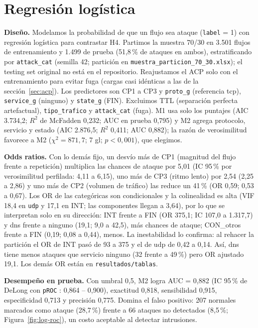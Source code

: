 \section{Regresión logística}
\label{sec:logistica}

\textbf{Diseño.} Modelamos la probabilidad de que un flujo sea ataque (\texttt{label} = 1) con regresión logística \citep{hosmer2013} para contrastar H4. Partimos la muestra 70/30 en 3.501 flujos de entrenamiento y 1.499 de prueba (51,8\,\% de ataques en ambos), estratificando por \texttt{attack\_cat} (semilla 42; partición en \texttt{muestra\_particion\_70\_30.xlsx}); el testing set original no está en el repositorio. Reajustamos el ACP solo con el entrenamiento para evitar fuga (cargas casi idénticas a las de la sección~\ref{sec:acp}). Los predictores son CP1 a CP3 y \texttt{proto\_g} (referencia tcp), \texttt{service\_g} (ninguno) y \texttt{state\_g} (FIN). Excluimos TTL (separación perfecta artefactual), \texttt{tipo\_trafico} y \texttt{attack\_cat} (fuga). M1 usa solo los puntajes (AIC 3.734,2; $R^2$ de McFadden 0,232; AUC en prueba 0,795) y M2 agrega protocolo, servicio y estado (AIC 2.876,5; $R^2$ 0,411; AUC 0,882); la razón de verosimilitud favorece a M2 ($\chi^2 = 871{,}7$; 7 gl; $p < 0{,}001$), que elegimos.

\textbf{Odds ratios.} Con lo demás fijo, un desvío más de CP1 (magnitud del flujo frente a repetición) multiplica las chances de ataque por 5,01 (IC 95\,\% por verosimilitud perfilada: 4,11 a 6,15), uno más de CP3 (ritmo lento) por 2,54 (2,25 a 2,86) y uno más de CP2 (volumen de tráfico) las reduce un 41\,\% (OR 0,59; 0,53 a 0,67). Los OR de las categóricas son condicionales y la colinealidad es alta (VIF 18,4 en \texttt{udp} y 17,1 en INT; las componentes llegan a 3,64), por lo que se interpretan solo en su dirección: INT frente a FIN (OR 375,1; IC 107,0 a 1.317,7) y dns frente a ninguno (19,1; 9,0 a 42,5), más chances de ataque; CON\_otros frente a FIN (0,19; 0,08 a 0,44), menos. La inestabilidad lo confirma: al rehacer la partición el OR de INT pasó de 93 a 375 y el de udp de 0,42 a 0,14. Así, dns tiene menos ataques que servicio ninguno (32 frente a 49\,\%) pero OR ajustado 19,1. Los demás OR están en \texttt{resultados/tablas}.

\textbf{Desempeño en prueba.} Con umbral 0,5, M2 logra AUC = 0,882 (IC 95\,\% de DeLong con \texttt{pROC} \citep{robin2011}: 0,864 -- 0,900), exactitud 0,818, sensibilidad 0,915, especificidad 0,713 y precisión 0,775. Domina el falso positivo: 207 normales marcados como ataque (28,7\,\%) frente a 66 ataques no detectados (8,5\,\%; Figura~\ref{fig:log-roc}), un costo aceptable al detectar intrusiones.

